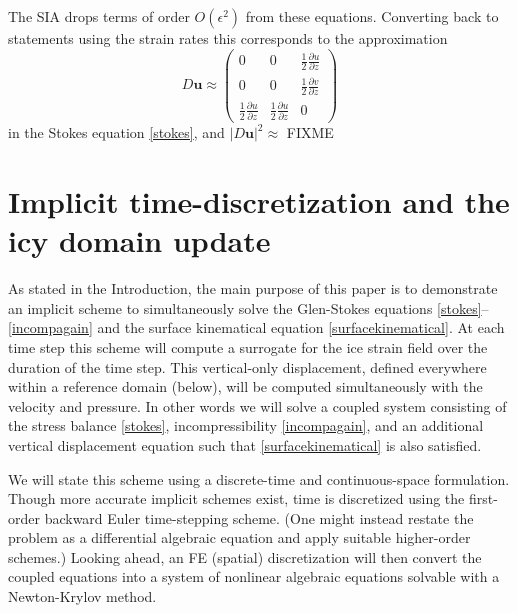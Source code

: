 \documentclass[letterpaper,final,12pt,reqno]{amsart}
\newcommand{\eps}{\epsilon}
\newcommand{\bu}{\mathbf{u}}
\begin{document}
The SIA drops terms of order $O(\eps^2)$ from these equations.  Converting back to statements using the strain rates this corresponds to the approximation
    $$D\bu \approx \begin{pmatrix} 0 & 0 & \frac{1}{2} \frac{\partial u}{\partial z} \\  0 & 0 & \frac{1}{2} \frac{\partial v}{\partial z} \\ \frac{1}{2} \frac{\partial u}{\partial z} & \frac{1}{2} \frac{\partial u}{\partial z} & 0 \end{pmatrix}$$
in the Stokes equation \eqref{stokes}, and $|D\bu|^2\approx $ FIXME


\section{Implicit time-discretization and the icy domain update} \label{sec:implicitstep}

As stated in the Introduction, the main purpose of this paper is to demonstrate an implicit scheme to simultaneously solve the Glen-Stokes equations \eqref{stokes}--\eqref{incompagain} and the surface kinematical equation \eqref{surfacekinematical}.  At each time step this scheme will compute a surrogate for the ice strain field over the duration of the time step.  This vertical-only displacement, defined everywhere within a reference domain (below), will be computed simultaneously with the velocity and pressure.  In other words we will solve a coupled system consisting of the stress balance \eqref{stokes}, incompressibility \eqref{incompagain}, and an additional vertical displacement equation such that \eqref{surfacekinematical} is also satisfied.

We will state this scheme using a discrete-time and continuous-space formulation.  Though more accurate implicit schemes exist, time is discretized using the first-order backward Euler time-stepping scheme.  (One might instead restate the problem as a differential algebraic equation and apply suitable higher-order schemes.)  Looking ahead, an FE (spatial) discretization will then convert the coupled equations into a system of nonlinear algebraic equations solvable with a Newton-Krylov method.

\end{document}
